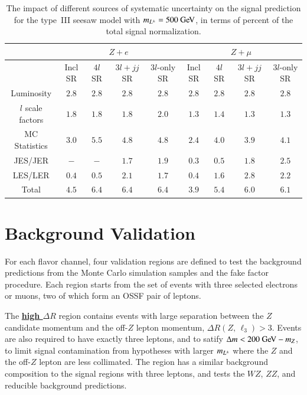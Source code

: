 \begin{table}[htbp]
  \centering
  \begin{tabular}{|c|c|c|c|c||c|c|c|c|}
    \hline
     & \multicolumn{4}{|c||}{$Z+e$} & \multicolumn{4}{c|}{$Z+\mu$} \\
    \hline
     &  Incl SR & $4l$ SR & $3l+jj$ SR  & $3l$-only SR  & Incl SR & $4l$ SR & $3l+jj$ SR  & $3l$-only SR  \\
    \hline
    Luminosity  & $2.8$ & $2.8$ & $2.8$ & $2.8$ & $2.8$ & $2.8$ & $2.8$ & $2.8$ \\
    $l$ scale factors & $1.8$ & $1.8$ & $1.8$ & $2.0$ & $1.3$ & $1.4$ & $1.3$ & $1.3$ \\
    MC Statistics & $3.0$ & $5.5$ & $4.8$ & $4.8$ & $2.4$ & $4.0$ & $3.9$ & $4.1$ \\
    JES/JER & $-$ & $-$ & $1.7$ & $1.9$ & $0.3$ & $0.5$ & $1.8$ & $2.5$ \\
    LES/LER & $0.4$ & $0.5$ & $2.1$ & $1.7$ & $0.4$ & $1.6$ & $2.8$ & $2.2$ \\
    \hline
    \hline
    Total & $4.5$ & $6.4$ & $6.4$ & $6.4$ & $3.9$ & $5.4$ & $6.0$ & $6.1$ \\
    \hline
  \end{tabular}
  \caption{The impact of different sources of systematic uncertainty on the signal prediction for the type~III seesaw model with $m_{\lpm}=500 \GeV$, in terms of percent of the total signal normalization.}
  \label{table:systematics-impact-summary-seesaw-500}
\end{table}


\section{Background Validation}\label{sec:resonance-background-validation}
For each flavor channel, four validation regions are defined to test the background predictions from the Monte Carlo simulation samples and the fake factor procedure. Each region starts from the set of events with three selected electrons or muons, two of which form an OSSF pair of leptons. 

The \underline{\textbf{high $\Delta R$}} region contains events with large separation between the $Z$ candidate momentum and the off-$Z$ lepton momentum, $\Delta R(Z,\,\ell_3)>3$. Events are also required to have exactly three leptons, and to satify $\deltam<200 \GeV - m_Z$, to limit signal contamination from hypotheses with larger $m_{L^{\pm}}$ where the $Z$ and the off-$Z$ lepton are less collimated. The region has a similar background composition to the signal regions with three leptons, and tests the $WZ$, $ZZ$, and reducible background predictions.

